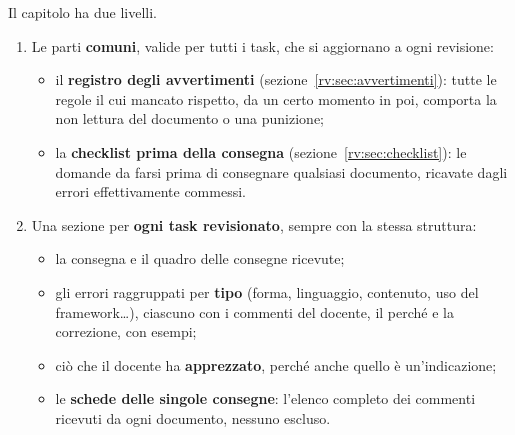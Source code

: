 Il capitolo ha due livelli.
\begin{enumerate}
  \item Le parti \textbf{comuni}, valide per tutti i task, che si aggiornano
        a ogni revisione:
        \begin{itemize}
          \item il \textbf{registro degli avvertimenti}
                (sezione~\ref{rv:sec:avvertimenti}): tutte le regole il cui
                mancato rispetto, da un certo momento in poi, comporta la non
                lettura del documento o una punizione;
          \item la \textbf{checklist prima della consegna}
                (sezione~\ref{rv:sec:checklist}): le domande da farsi prima di
                consegnare qualsiasi documento, ricavate dagli errori
                effettivamente commessi.
        \end{itemize}
  \item Una sezione per \textbf{ogni task revisionato}, sempre con la stessa
        struttura:
        \begin{itemize}
          \item la consegna e il quadro delle consegne ricevute;
          \item gli errori raggruppati per \textbf{tipo} (forma, linguaggio,
                contenuto, uso del framework\dots), ciascuno con i commenti
                del docente, il perché e la correzione, con esempi;
          \item ciò che il docente ha \textbf{apprezzato}, perché anche quello
                è un'indicazione;
          \item le \textbf{schede delle singole consegne}: l'elenco completo
                dei commenti ricevuti da ogni documento, nessuno escluso.
        \end{itemize}
\end{enumerate}

